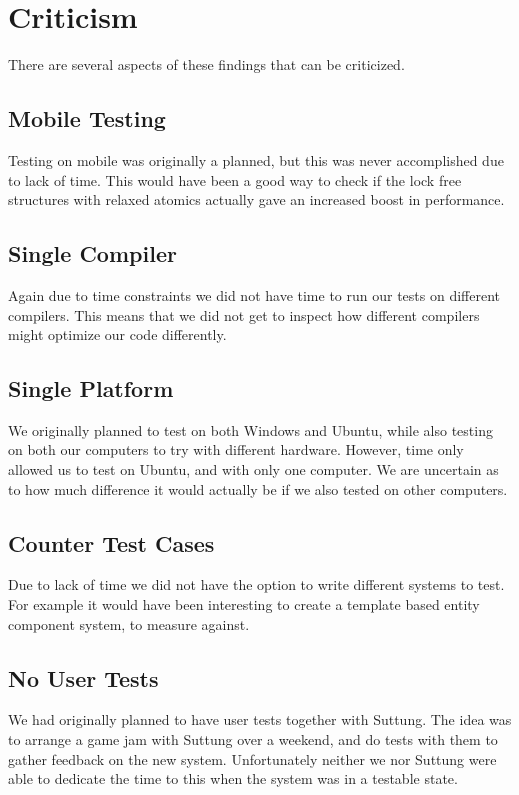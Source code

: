 \section{Criticism}
There are several aspects of these findings that can be criticized.

\subsection{Mobile Testing}
Testing on mobile was originally a planned, but this was never accomplished due to lack of time.
This would have been a good way to check if the lock free structures with relaxed atomics actually
gave an increased boost in performance.

\subsection{Single Compiler}
Again due to time constraints we did not have time to run our tests on different compilers.
This means that we did not get to inspect how different compilers might optimize our code differently.

\subsection{Single Platform}
We originally planned to test on both Windows and Ubuntu, while also testing on both our computers to
try with different hardware. However, time only allowed us to test on Ubuntu, and with only one computer.
We are uncertain as to how much difference it would actually be if we also tested on other computers.

\subsection{Counter Test Cases}
Due to lack of time we did not have the option to write different systems to test.
For example it would have been interesting to create a template based entity component system,
to measure against.

\subsection{No User Tests}
We had originally planned to have user tests together with Suttung.
The idea was to arrange a game jam with Suttung over a weekend,
and do tests with them to gather feedback on the new system.
Unfortunately neither we nor Suttung were able to dedicate the time to this when the system
was in a testable state.


